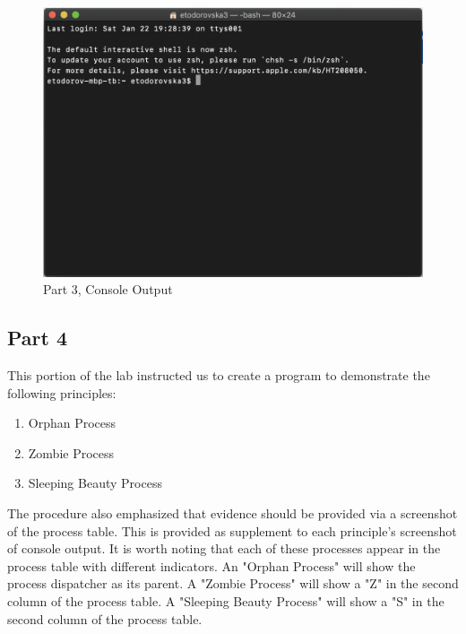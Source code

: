        \begin{figure}[H]
            \centering
            \includegraphics[width=\linewidth]{figures/placeholder.png}
            \caption{Part 3, Console Output}
            \label{fig:part3_output}
        \end{figure}



    \newpage
    \subsection{Part 4}\label{subsec:part4}
        This portion of the lab instructed us to create a program to demonstrate the following principles:

        \begin{enumerate}
            \itemsep0em
            \item Orphan Process
            \item Zombie Process
            \item Sleeping Beauty Process
        \end{enumerate}

        \noindent The procedure also emphasized that evidence should be provided via a screenshot of the process table.
        This is provided as supplement to each principle's screenshot of console output.
        It is worth noting that each of these processes appear in the process table with different indicators.
        An "Orphan Process" will show the process dispatcher as its parent.
        A "Zombie Process" will show a "Z" in the second column of the process table.
        A "Sleeping Beauty Process" will show a "S" in the second column of the process table.


